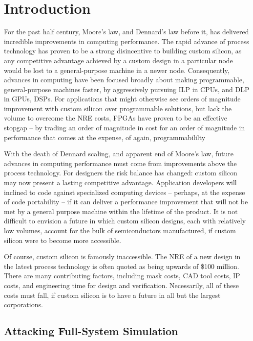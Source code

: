 \chapter{Introduction}

For the past half century, Moore's law, and Dennard's law before it, has
delivered incredible improvements in computing performance. The rapid advance
of process technology has proven to be a strong disincentive to building custom
silicon, as any competitive advantage achieved by a
custom design in a particular node would be lost to a general-purpose
machine in a newer node. Consequently, advances in computing have
been focused broadly about making programmable, general-purpose machines
faster, by aggressively pursuing ILP in CPUs, and DLP in GPUs, DSPs. For
applications that might otherwise see orders of magnitude improvement with
custom silicon over programmable solutions, but lack the volume to overcome the
NRE costs, FPGAs have proven to be an effective stopgap -- by trading an order of
magnitude in cost for an order of magnitude in performance that comes at the
expense, of again, programmabililty

With the death of Dennard scaling, and apparent end of Moore’s law, future
advances in computing performance must come from improvements above the process
technology.  For designers the risk balance has changed: custom silicon may now
present a lasting competitive advantage. Application developers will inclined
to code against specialized computing devices -- perhaps, at the expense of
code portability -- if it can deliver a performance improvement that will not
be met by a general purpose machine within the lifetime of the product. It is
not difficult to envision a future in which custom silicon designs, each with
relatively low volumes, account for the bulk of semiconductors manufactured, if
custom silicon were to become more accessible.


Of course, custom silicon is famously inaccessible. The NRE of a new design in
the latest process technology is often quoted as being upwards of \$100
million.  There are many contributing factors, including mask
costs, CAD tool costs, IP costs, and engineering time for design and
verification. Necessarily, all of these costs must fall, if custom silicon is
to have a future in all but the largest corporations.

\section{Attacking Full-System Simulation}

